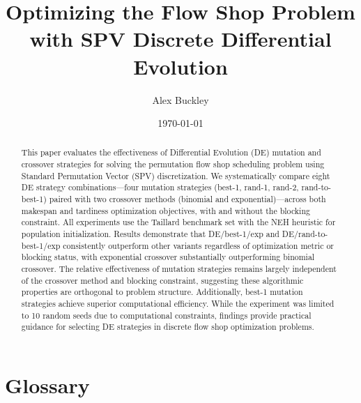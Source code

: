 \documentclass{article}
\title{Optimizing the Flow Shop Problem with SPV Discrete Differential Evolution}
\author{Alex Buckley}
\date{\today}
\begin{document}
\maketitle

\begin{abstract}

This paper evaluates the effectiveness of Differential Evolution (DE) mutation and crossover strategies for solving the permutation flow shop scheduling problem using Standard Permutation Vector (SPV) discretization. We systematically compare eight DE strategy combinations---four mutation strategies (best-1, rand-1, rand-2, rand-to-best-1) paired with two crossover methods (binomial and exponential)---across both makespan and tardiness optimization objectives, with and without the blocking constraint. All experiments use the Taillard benchmark set with the NEH heuristic for population initialization. Results demonstrate that DE/best-1/exp and DE/rand-to-best-1/exp consistently outperform other variants regardless of optimization metric or blocking status, with exponential crossover substantially outperforming binomial crossover. The relative effectiveness of mutation strategies remains largely independent of the crossover method and blocking constraint, suggesting these algorithmic properties are orthogonal to problem structure. Additionally, best-1 mutation strategies achieve superior computational efficiency. While the experiment was limited to 10 random seeds due to computational constraints, findings provide practical guidance for selecting DE strategies in discrete flow shop optimization problems.

\end{abstract}

\clearpage

\clearpage

\tableofcontents
\clearpage

\listoftables
\clearpage

\listoffigures
\clearpage

\listofequations
\clearpage

\section*{Glossary}
\end{document}
